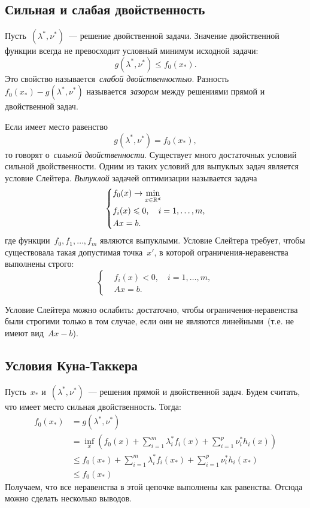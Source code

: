 \documentclass[12pt,fleqn]{article}
\begin{document}
\subsection{Сильная и слабая двойственность}
Пусть~$(\lambda^*, \nu^*)$~--- решение двойственной задачи.
Значение двойственной функции всегда не превосходит условный
минимум исходной задачи:
\[
    g(\lambda^*, \nu^*)
    \leq
    f_0(x_*).
\]
Это свойство называется~\emph{слабой двойственностью}.
Разность~$f_0(x_*) - g(\lambda^*, \nu^*)$ называется~\emph{зазором}
между решениями прямой и двойственной задач.

Если имеет место равенство
\[
    g(\lambda^*, \nu^*)
    =
    f_0(x_*),
\]
то говорят о~\emph{сильной двойственности}.
Существует много достаточных условий сильной двойственности.
Одним из таких условий для выпуклых задач является условие Слейтера.
\emph{Выпуклой} задачей оптимизации называется задача
\[
    \left\{
        \begin{aligned}
            & f_0(x) \to \min_{x \in \mathbb{R}^d} \\
            & f_i(x) \leqslant 0, \quad i = 1, \dots, m, \\
            & Ax = b.
        \end{aligned}
    \right.
\]
где функции~$f_0, f_1, \dots, f_m$ являются выпуклыми.
Условие Слейтера требует, чтобы существовала такая допустимая точка~$x'$,
в которой ограничения-неравенства выполнены строго:
\[
    \left\{
        \begin{aligned}
            & f_i(x) < 0, \quad i = 1, \dots, m, \\
            & Ax = b.
        \end{aligned}
    \right.
\]

Условие Слейтера можно ослабить: достаточно, чтобы
ограничения-неравенства были строгими только в том случае, если
они не являются линейными~(т.е. не имеют вид~$Ax - b$).

\subsection{Условия Куна-Таккера}
Пусть~$x_*$ и~$(\lambda^*, \nu^*)$~--- решения прямой и двойственной задач.
Будем считать, что имеет место сильная двойственность.
Тогда:
\begin{align*}
	f_0(x_*)
	&= g(\lambda^*, \nu^*) \\
	&=
	\inf_x \left(
	f_0(x)
	+
	\sum_{i = 1}^{m} \lambda_i^* f_i(x)
	+
	\sum_{i = 1}^{p} \nu_i^* h_i(x)
	\right) \\
	&\leq
	f_0(x_*)
	+
	\sum_{i = 1}^{m} \lambda_i^* f_i(x_*)
	+
	\sum_{i = 1}^{p} \nu_i^* h_i(x_*) \\
	&\leq
	f_0(x_*)
\end{align*}
Получаем, что все неравенства в этой цепочке выполнены как равенства.
Отсюда можно сделать несколько выводов.
\end{document}

